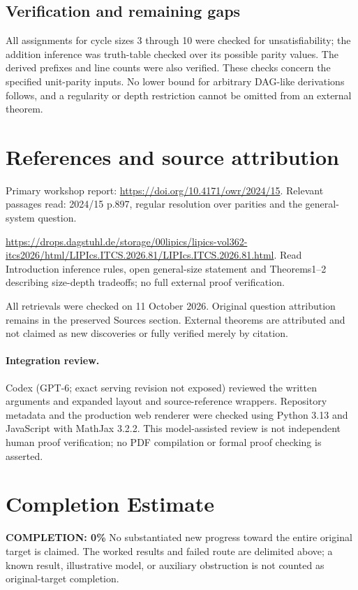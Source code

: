 \documentclass[11pt]{article}
\begin{document}
\subsection{Verification and remaining gaps}
All assignments for cycle sizes 3 through 10 were checked for unsatisfiability; the addition inference was truth-table checked over its possible parity values. The derived prefixes and line counts were also verified. These checks concern the specified unit-parity inputs. No lower bound for arbitrary DAG-like derivations follows, and a regularity or depth restriction cannot be omitted from an external theorem.

\section{References and source attribution}
Primary workshop report: \url{https://doi.org/10.4171/owr/2024/15}. Relevant passages read: 2024/15 p.897, regular resolution over parities and the general-system question.

\url{https://drops.dagstuhl.de/storage/00lipics/lipics-vol362-itcs2026/html/LIPIcs.ITCS.2026.81/LIPIcs.ITCS.2026.81.html}. Read Introduction inference rules, open general-size statement and Theorems1--2 describing size-depth tradeoffs; no full external proof verification.

All retrievals were checked on 11 October 2026. Original question attribution remains in the preserved Sources section. External theorems are attributed and not claimed as new discoveries or fully verified merely by citation.


\paragraph{Integration review.} Codex (GPT-6; exact serving revision not exposed) reviewed the written arguments and expanded layout and source-reference wrappers. Repository metadata and the production web renderer were checked using Python 3.13 and JavaScript with MathJax 3.2.2. This model-assisted review is not independent human proof verification; no PDF compilation or formal proof checking is asserted.

\section{Completion Estimate}
\noindent\textbf{COMPLETION: 0\%}
No substantiated new progress toward the entire original target is claimed. The worked results and failed route are delimited above; a known result, illustrative model, or auxiliary obstruction is not counted as original-target completion.
\end{document}
